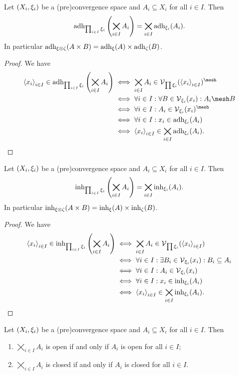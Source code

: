 \begin{corollary} \label{productAdherence}
Let $\sSet{X_i, \xi_i}$ be a (pre)convergence space and $A_i\subseteq X_i$ for all $i\in I$. Then
\[ \operatorname{adh}_{\prod_{i\in I}\xi_i}\left(\bigtimes_{i\in I}A_i\right) = \bigtimes_{i\in I}\operatorname{adh}_{\xi_i}(A_i). \]
In particular $\operatorname{adh}_{\xi\otimes \zeta}(A\times B) = \operatorname{adh}_\xi(A) \times \operatorname{adh}_\zeta(B)$.
\end{corollary}
\begin{proof}
We have
\begin{align*}
\seq{x_i}_{i\in I} \in \adh_{\prod_{i\in I}\xi_i}\left(\bigtimes_{i\in I}A_i\right) &\iff \bigtimes_{i\in I}A_i \in \vicinity_{\prod \xi_i}(\seq{x_i}_{i\in I})^{\mesh} \\
&\iff \forall i\in I: \forall B \in \vicinity_{\xi_i}(x_i): A_i\mesh B \\
&\iff \forall i\in I: A_i \in \vicinity_{\xi_i}(x_i)^{\mesh} \\
&\iff \forall i\in I: x_i \in \adh_{\xi_i}(A_i) \\
&\iff \seq{x_i}_{i\in I} \in \bigtimes_{i\in I}\adh_{\xi_i}(A_i).
\end{align*}
\end{proof}
\begin{corollary} \label{productInherence}
Let $\sSet{X_i, \xi_i}$ be a (pre)convergence space and $A_i\subseteq X_i$ for all $i\in I$. Then
\[ \operatorname{inh}_{\prod_{i\in I}\xi_i}\left(\bigtimes_{i\in I}A_i\right) = \bigtimes_{i\in I}\operatorname{inh}_{\xi_i}(A_i). \]
In particular $\operatorname{inh}_{\xi\otimes \zeta}(A\times B) = \operatorname{inh}_\xi(A) \times \operatorname{inh}_\zeta(B)$.
\end{corollary}
\begin{proof}
We have
\begin{align*}
\left\langle x_i \right\rangle_{i\in I} \in \operatorname{inh}_{\prod_{i\in I}\xi_i}\left(\bigtimes_{i\in I}A_i\right) &\iff \bigtimes_{i\in I}A_i \in \operatorname{\mathcal{V}}_{\prod \xi_i}(\left\langle x_i \right\rangle_{i\in I}) \\
&\iff \forall i\in I: \exists B_i \in \operatorname{\mathcal{V}}_{\xi_i}(x_i): B_i\subseteq A_i \\
&\iff \forall i\in I: A_i \in \operatorname{\mathcal{V}}_{\xi_i}(x_i) \\
&\iff \forall i\in I: x_i \in \operatorname{inh}_{\xi_i}(A_i) \\
&\iff \left\langle x_i \right\rangle_{i\in I} \in \bigtimes_{i\in I}\operatorname{inh}_{\xi_i}(A_i).
\end{align*}
\end{proof}
\begin{corollary} \label{productOpenClosed}
Let $\sSet{X_i, \xi_i}$ be a (pre)convergence space and $A_i\subseteq X_i$ for all $i\in I$. Then
\begin{enumerate}
\item $\bigtimes_{i\in I}A_i$ is open \textup{if and only if} $A_i$ is open for all $i\in I$;
\item $\bigtimes_{i\in I}A_i$ is closed \textup{if and only if} $A_i$ is closed for all $i\in I$.
\end{enumerate}
\end{corollary}

